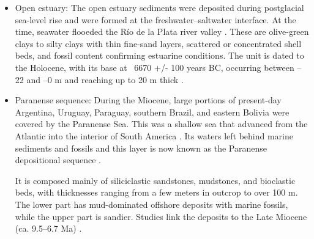 \begin{itemize}
    \item Open estuary: The open estuary sediments were deposited during postglacial sea-level rise and were formed at the freshwater–saltwater interface. At the time, seawater flooeded the Río de la Plata river valley \autocite{joseluiscavallottoEvolucionCambiosAmbientales2005}.
    These are olive-green clays to silty clays with thin fine-sand layers, scattered or concentrated shell beds, and fossil content confirming estuarine conditions. The unit is dated to the Holocene, with its base at ~6670 +/- 100 years BC, occurring between –22 and –0 m and reaching up to 20 m thick \autocite{vogelGroningenRadiocarbonDates1969}.
    
    \item Paranense sequence: During the Miocene, large portions of present-day Argentina, Uruguay, Paraguay, southern Brazil, and eastern Bolivia were covered by the Paranense Sea. This was a shallow sea that advanced from the Atlantic into the interior of South America . Its waters left behind marine sediments and fossils and this layer is now known as the Paranense depositional sequence \autocite{tineoReconstructingSouthAmerican2024}.
    
    It is composed mainly of siliciclastic sandstones, mudstones, and bioclastic beds, with thicknesses ranging from a few meters in outcrop to over 100 m. The lower part has mud-dominated offshore deposits with marine fossils, while the upper part is sandier. Studies link the deposits to the Late Miocene (ca. 9.5–6.7 Ma) \autocite{tineoReconstructingSouthAmerican2024}.
\end{itemize}




